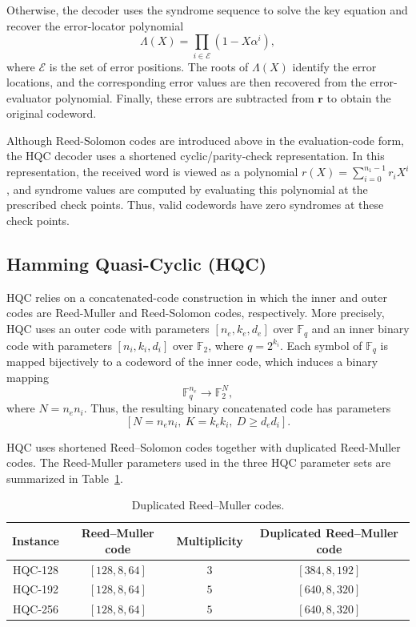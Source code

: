 \documentclass[12pt,a4paper]{report}
\begin{document}
Otherwise, the decoder uses the syndrome sequence to solve the key equation and recover the error-locator polynomial
\[
    \Lambda(X)=\prod_{i\in\mathcal{E}}(1-X\alpha^i),
\]
where $\mathcal{E}$ is the set of error positions. The roots of $\Lambda(X)$ identify the error locations, and the corresponding error values are then
recovered from the error-evaluator polynomial. Finally, these errors are subtracted from $\mathbf{r}$ to obtain the original codeword.

Although Reed-Solomon codes are introduced above in the evaluation-code form, the HQC decoder uses a shortened cyclic/parity-check representation. In this representation, the received word is viewed as a polynomial \(r(X)=\sum_{i=0}^{n_1-1} r_iX^i\), and syndrome values are computed by evaluating this polynomial at the prescribed check points. Thus, valid codewords have zero syndromes at these check points.




\subsection{Hamming Quasi-Cyclic (HQC)}

HQC relies on a concatenated-code construction in which the inner and outer codes are Reed-Muller and Reed-Solomon codes, respectively. More precisely,
HQC uses an outer code with parameters $[n_e,k_e,d_e]$ over $\mathbb{F}_q$ and an inner binary code with parameters $[n_i,k_i,d_i]$ over $\mathbb{F}_2$, where $q=2^{k_i}$. Each symbol of $\mathbb{F}_q$ is mapped bijectively to a codeword of
the inner code, which induces a binary mapping
\[
    \mathbb{F}_q^{n_e} \longrightarrow \mathbb{F}_2^N,
\]
where $N=n_e n_i$. Thus, the resulting binary concatenated code has parameters
\[
    [N=n_e n_i,\ K=k_e k_i,\ D\ge d_e d_i].
\]

HQC uses shortened Reed--Solomon codes together with duplicated Reed-Muller codes. The Reed-Muller parameters used in the three HQC parameter sets are
summarized in Table~\ref{tab:duplicated-rm-codes}.


\begin{table}[h]
\centering
\renewcommand{\arraystretch}{1.15}
\caption{Duplicated Reed--Muller codes.}
\label{tab:duplicated-rm-codes}
\begin{tabular}{|c|c|c|c|}
\hline
Instance & Reed--Muller code & Multiplicity & Duplicated Reed--Muller code \\
\hline
HQC-128 & $[128,8,64]$ & $3$ & $[384,8,192]$ \\
\hline
HQC-192 & $[128,8,64]$ & $5$ & $[640,8,320]$ \\
\hline
HQC-256 & $[128,8,64]$ & $5$ & $[640,8,320]$ \\
\hline
\end{tabular}
\end{table}
\end{document}
